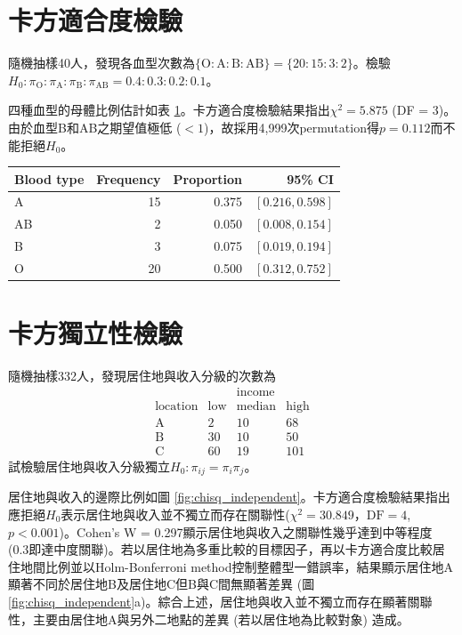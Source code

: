 \documentclass[12pt]{article}
\begin{document}
\section{卡方適合度檢驗}
隨機抽樣40人，發現各血型次數為$\{\text{O} : \text{A} : \text{B} : \text{AB}\} = \{20:15:3:2\}$。檢驗$H_0: \pi_{\mathrm{O}} : \pi_{\mathrm{A}} : \pi_{\mathrm{B}} : \pi_{\mathrm{AB}} = 0.4:0.3:0.2:0.1$。

四種血型的母體比例估計如表 \ref{table:chisq_goodness}。卡方適合度檢驗結果指出$\chi^2 = 5.875$ (DF = 3)。由於血型B和AB之期望值極低 ($<1$)，故採用4,999次permutation得$p = 0.112$而不能拒絕$H_0$。

\begin{table}[htb!]
	\centering
	\begin{tabular}{lrrr}
		\hline
		Blood type & Frequency & Proportion & 95\% CI \\ 
		\hline
		A & 15 & 0.375 & $\left[0.216, 0.598\right]$ \\ 
		AB & 2 & 0.050 & $\left[0.008, 0.154\right]$ \\ 
		B & 3 & 0.075 & $\left[0.019, 0.194\right]$ \\ 
		O & 20 & 0.500 & $\left[0.312, 0.752\right]$ \\ 
		\hline
	\end{tabular}
	\label{table:chisq_goodness}
\end{table}


\section{卡方獨立性檢驗}
隨機抽樣332人，發現居住地與收入分級的次數為
\[
	\begin{matrix}
		                & &\text{income} &  \\
		\text{location} & \text{low} & \text{median} & \text{high}\\
		\text{A} & 2 & 10 & 68 \\
		\text{B} & 30 & 10 & 50 \\
		\text{C} & 60 & 19 & 101
	\end{matrix}
\]
試檢驗居住地與收入分級獨立$H_0: \pi_{ij} = \pi_i\pi_j$。

居住地與收入的邊際比例如圖 \ref{fig:chisq_independent}。卡方適合度檢驗結果指出應拒絕$H_0$表示居住地與收入並不獨立而存在關聯性($\chi^2 = 30.849$，$\text{DF} = 4$, $p < 0.001$)。Cohen's W = 0.297顯示居住地與收入之關聯性幾乎達到中等程度 (0.3即達中度關聯)。若以居住地為多重比較的目標因子，再以卡方適合度比較居住地間比例並以Holm-Bonferroni method控制整體型一錯誤率，結果顯示居住地A顯著不同於居住地B及居住地C但B與C間無顯著差異 (圖 \ref{fig:chisq_independent}a)。綜合上述，居住地與收入並不獨立而存在顯著關聯性，主要由居住地A與另外二地點的差異 (若以居住地為比較對象) 造成。
\end{document}
